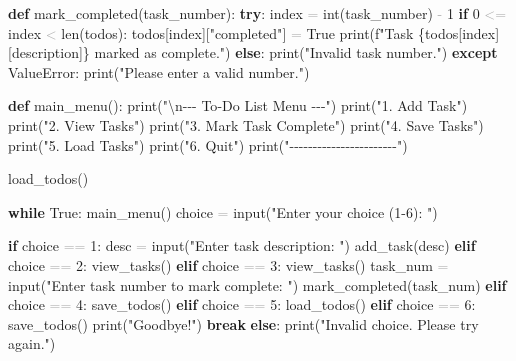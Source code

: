 \documentclass[
  justified,
  openright,
]{tufte-book}
\newcommand{\KeywordTok}[1]{\textcolor{CodeKeyword}{\textbf{#1}}}  %
\newcommand{\StringTok}[1]{\textcolor{CodeString}{#1}}              %
\newcommand{\CodeNumTok}[1]{\textcolor{CodeNumber}{#1}}             %
\newcommand{\CodeAccentTok}[1]{\textcolor{CodeAccent}{#1}}          %
\newcommand{\OperatorTok}[1]{\textcolor{DarkGray}{#1}}              %
\newenvironment{Shaded}{%
  \begin{mdframed}[style=TufteCode]%
}{%
  \end{mdframed}%
}
\begin{document}
\begin{Shaded}
\begin{Highlighting}[]
 
\KeywordTok{def} mark\_completed(task\_number):
    \KeywordTok{try}:
        index \OperatorTok{=} int(task\_number) \OperatorTok{{-}} \CodeNumTok{1}
        \KeywordTok{if} \CodeNumTok{0} \OperatorTok{\textless{}=} index \OperatorTok{\textless{}} len(todos):
            todos[index][\StringTok{"completed"}] \OperatorTok{=} True
            print(\StringTok{f"Task \textquotesingle{}}\StringTok{\{}todos[index][\StringTok{\textquotesingle{}description\textquotesingle{}}]\StringTok{\}}\StringTok{\textquotesingle{} marked as complete."})
        \KeywordTok{else}:
            print(\StringTok{"Invalid task number."})
    \KeywordTok{except} \CodeAccentTok{ValueError}:
        print(\StringTok{"Please enter a valid number."})
 
 
\KeywordTok{def} main\_menu():
    print(\StringTok{"}\StringTok{\textbackslash{}n}\StringTok{{-}{-}{-} To{-}Do List Menu {-}{-}{-}"})
    print(\StringTok{"1. Add Task"})
    print(\StringTok{"2. View Tasks"})
    print(\StringTok{"3. Mark Task Complete"})
    print(\StringTok{"4. Save Tasks"})
    print(\StringTok{"5. Load Tasks"})
    print(\StringTok{"6. Quit"})
    print(\StringTok{"{-}{-}{-}{-}{-}{-}{-}{-}{-}{-}{-}{-}{-}{-}{-}{-}{-}{-}{-}{-}{-}{-}{-}"})
 
 
load\_todos()
 
\KeywordTok{while} True:
    main\_menu()
    choice \OperatorTok{=} input(\StringTok{"Enter your choice (1{-}6): "})
 
    \KeywordTok{if} choice \OperatorTok{==} \StringTok{\textquotesingle{}1\textquotesingle{}}:
        desc \OperatorTok{=} input(\StringTok{"Enter task description: "})
        add\_task(desc)
    \KeywordTok{elif} choice \OperatorTok{==} \StringTok{\textquotesingle{}2\textquotesingle{}}:
        view\_tasks()
    \KeywordTok{elif} choice \OperatorTok{==} \StringTok{\textquotesingle{}3\textquotesingle{}}:
        view\_tasks()
        task\_num \OperatorTok{=} input(\StringTok{"Enter task number to mark complete: "})
        mark\_completed(task\_num)
    \KeywordTok{elif} choice \OperatorTok{==} \StringTok{\textquotesingle{}4\textquotesingle{}}:
        save\_todos()
    \KeywordTok{elif} choice \OperatorTok{==} \StringTok{\textquotesingle{}5\textquotesingle{}}:
        load\_todos()
    \KeywordTok{elif} choice \OperatorTok{==} \StringTok{\textquotesingle{}6\textquotesingle{}}:
        save\_todos()
        print(\StringTok{"Goodbye!"})
        \KeywordTok{break}
    \KeywordTok{else}:
        print(\StringTok{"Invalid choice. Please try again."})
\end{Highlighting}
\end{Shaded}
\end{document}
